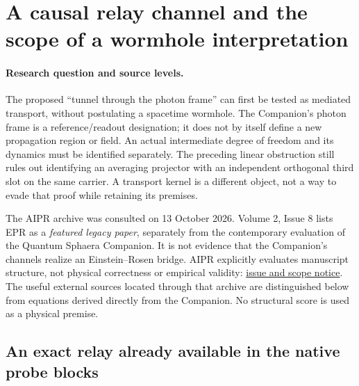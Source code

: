 \documentclass[11pt,a4paper]{article}
\begin{document}
\section{A causal relay channel and the scope of a wormhole interpretation}
\label{sec:causal-relay-channel}

\paragraph{Research question and source levels.}
The proposed ``tunnel through the photon frame'' can first be tested
as mediated transport, without postulating a spacetime wormhole.
The Companion's photon frame is a reference/readout designation;
it does not by itself define a new propagation region or field.
An actual intermediate degree of freedom and its dynamics must be
identified separately. The preceding linear obstruction still rules
out identifying an averaging projector with an independent orthogonal
third slot on the same carrier. A transport kernel is a different
object, not a way to evade that proof while retaining its premises.

The AIPR archive was consulted on 13 October 2026. Volume 2,
Issue 8 lists EPR as a \emph{featured legacy paper}, separately from
the contemporary evaluation of the Quantum Sphaera Companion.
It is not evidence that the Companion's channels realize an
Einstein--Rosen bridge. AIPR explicitly evaluates manuscript
structure, not physical correctness or empirical validity:
\href{https://aiphysicsreview.org/vol-02_issue-08/}{issue and scope notice}.
The useful external sources located through that archive are
distinguished below from equations derived directly from the
Companion. No structural score is used as a physical premise.

\subsection{An exact relay already available in the native probe blocks}
\end{document}
